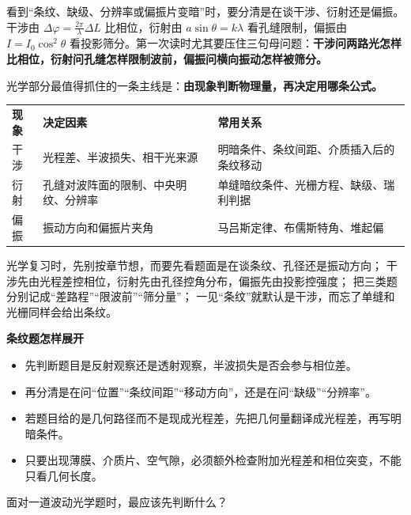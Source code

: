 \documentclass[lang=cn,11pt]{elegantbook}
\newcommand{\bridge}[1]{\begin{note}#1\end{note}}
\begin{document}
\bridge{看到“条纹、缺级、分辨率或偏振片变暗”时，要分清是在谈干涉、衍射还是偏振。干涉由 \(\Delta\varphi=\frac{2\pi}{\lambda}\Delta L\) 比相位，衍射由 \(a\sin\theta=k\lambda\) 看孔缝限制，偏振由 \(I=I_0\cos^2\theta\) 看投影筛分。第一次读时尤其要压住三句母问题：\textbf{干涉问两路光怎样比相位，衍射问孔缝怎样限制波前，偏振问横向振动怎样被筛分。}}

光学部分最值得抓住的一条主线是：\textbf{由现象判断物理量，再决定用哪条公式。}

\begin{center}
\renewcommand{\arraystretch}{1.2}
\begin{tabular}{>{\raggedright\arraybackslash}p{} >{\raggedright\arraybackslash}p{} >{\raggedright\arraybackslash}p{}}
\textbf{现象} & \textbf{决定因素} & \textbf{常用关系} \\
干涉 & 光程差、半波损失、相干光来源 & 明暗条件、条纹间距、介质插入后的条纹移动 \\
衍射 & 孔缝对波阵面的限制、中央明纹、分辨率 & 单缝暗纹条件、光栅方程、缺级、瑞利判据 \\
偏振 & 振动方向和偏振片夹角 & 马吕斯定律、布儒斯特角、堆起偏 \\
\end{tabular}
\end{center}

\begin{note}
 光学复习时，先别按章节想，而要先看题面是在谈条纹、孔径还是振动方向； 干涉先由光程差控相位，衍射先由孔径控角分布，偏振先由投影控强度； 把三类题分别记成“差路程”“限波前”“筛分量”； 一见“条纹”就默认是干涉，而忘了单缝和光栅同样会给出条纹。
\end{note}

\textbf{条纹题怎样展开}

\begin{itemize}
 \item 先判断题目是反射观察还是透射观察，半波损失是否会参与相位差。
 \item 再分清是在问“位置”“条纹间距”“移动方向”，还是在问“缺级”“分辨率”。
 \item 若题目给的是几何路径而不是现成光程差，先把几何量翻译成光程差，再写明暗条件。
 \item 只要出现薄膜、介质片、空气隙，必须额外检查附加光程差和相位突变，不能只看几何长度。
\end{itemize}

\begin{exercise}[光学复习怎样开题]
面对一道波动光学题时，最应该先判断什么？
\end{exercise}
\end{document}
